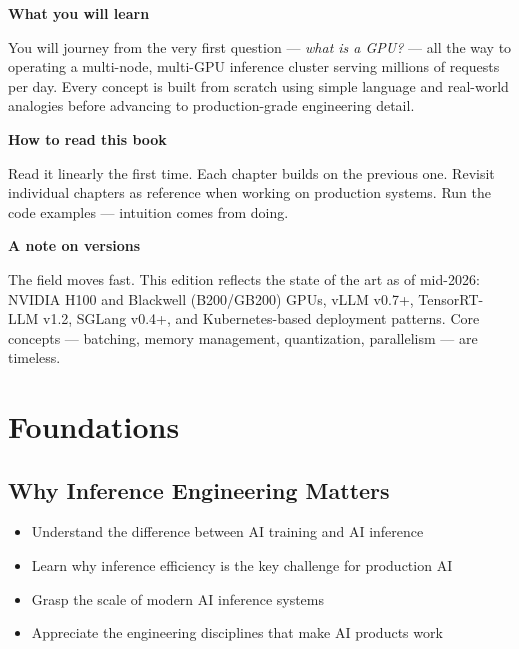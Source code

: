 \documentclass[11pt, twoside, openright]{book}
\newenvironment{learningobjectives}
  {\begin{tcolorbox}[enhanced, breakable,
    colback={rgb,255:red,232;green,240;blue,255},
    colframe=NavyBlue, boxrule=1.5pt, arc=4pt,
    title={\bfseries Learning Objectives},
    fonttitle=\bfseries\color{white},
    attach boxed title to top left={yshift=-2mm, xshift=5mm},
    boxed title style={colback=NavyBlue, arc=2pt}]
  \begin{itemize}[leftmargin=1.5em, itemsep=2pt]}
  {\end{itemize}\end{tcolorbox}}
\begin{document}
\bigskip
\noindent\textbf{What you will learn}

You will journey from the very first question --- \textit{what is a GPU?} --- all the
way to operating a multi-node, multi-GPU inference cluster serving millions of
requests per day.  Every concept is built from scratch using simple language and
real-world analogies before advancing to production-grade engineering detail.

\bigskip
\noindent\textbf{How to read this book}

Read it linearly the first time.  Each chapter builds on the previous one.
Revisit individual chapters as reference when working on production systems.
Run the code examples --- intuition comes from doing.

\bigskip
\noindent\textbf{A note on versions}

The field moves fast.  This edition reflects the state of the art as of mid-2026:
NVIDIA H100 and Blackwell (B200/GB200) GPUs, vLLM v0.7+, TensorRT-LLM v1.2,
SGLang v0.4+, and Kubernetes-based deployment patterns.  Core concepts --- batching,
memory management, quantization, parallelism --- are timeless.

\clearpage

\part{Foundations}

\chapter{Why Inference Engineering Matters}
\label{ch:why}

\begin{learningobjectives}
  \item Understand the difference between AI training and AI inference
  \item Learn why inference efficiency is the key challenge for production AI
  \item Grasp the scale of modern AI inference systems
  \item Appreciate the engineering disciplines that make AI products work
\end{learningobjectives}
\end{document}
